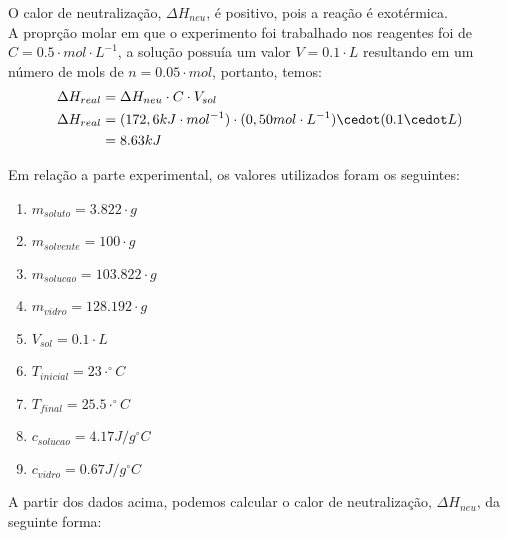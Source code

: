             \indent O calor de neutralização, $\Delta{H_{neu}}$, é positivo, pois a reação é exotérmica.\\
            \indent A proprção molar em que o experimento foi trabalhado nos reagentes foi de $C = 0.5 \cdot mol \cdot L^{-1}$, a solução possuía um valor $V = 0.1\cdot L$ resultando em um número de mols de $n = 0.05 \cdot mol$, portanto, temos:\\
            \begin{equation}
                \begin{split}
                	\notag
                    \Delta{H_{real}} &= \Delta{H_{neu}} \cdot C \cdot V_{sol}\\
                    \Delta{H_{real}} &=(172,6 kJ \cdot mol^{-1}) \cdot (0,50 mol \cdot L^{-1}) \cedot (0.1 \cedot L) \\
                    &= 8.63 kJ\\
                \end{split}\label{eq:equation}
            \end{equation}     

            
            \indent Em relação a parte experimental, os valores utilizados foram os seguintes:\\
            \begin{enumerate}
            	\item $m_{soluto} = 3.822 \cdot g$
                \item $m_{solvente} = 100 \cdot g$
                \item $m_{solucao} = 103.822 \cdot g$
                \item $m_{vidro} = 128.192 \cdot g$
                \item $V_{sol} = 0.1 \cdot L$
                \item $T_{inicial} = 23 \cdot ^{\circ}C$
                \item $T_{final} = 25.5 \cdot ^{\circ}C$
                \item $c_{solucao} = 4.17 J /g ^{\circ}C$
                \item $c_{vidro} = 0.67 J / g ^{\circ}C$
            \end{enumerate}

            \indent A partir dos dados acima, podemos calcular o calor de neutralização, $\Delta{H_{neu}}$, da seguinte forma:\


